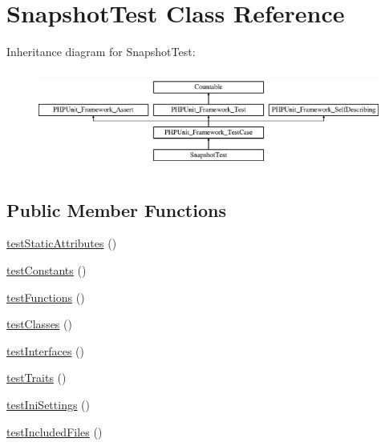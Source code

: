 \hypertarget{class_sebastian_bergmann_1_1_global_state_1_1_snapshot_test}{}\section{Snapshot\+Test Class Reference}
\label{class_sebastian_bergmann_1_1_global_state_1_1_snapshot_test}
Inheritance diagram for Snapshot\+Test\+:\begin{figure}[H]
\begin{center}
\leavevmode
\includegraphics[height=3.303835cm]{class_sebastian_bergmann_1_1_global_state_1_1_snapshot_test}
\end{center}
\end{figure}
\subsection*{Public Member Functions}
\begin{DoxyCompactItemize}
\item 
\mbox{\hyperlink{class_sebastian_bergmann_1_1_global_state_1_1_snapshot_test_a9e6202d04ca505605b8b89d4a6fc947d}{test\+Static\+Attributes}} ()
\item 
\mbox{\hyperlink{class_sebastian_bergmann_1_1_global_state_1_1_snapshot_test_a6569023f4fa1812a53de8a36759faf57}{test\+Constants}} ()
\item 
\mbox{\hyperlink{class_sebastian_bergmann_1_1_global_state_1_1_snapshot_test_a9f093380174fdac4f36043524369e88e}{test\+Functions}} ()
\item 
\mbox{\hyperlink{class_sebastian_bergmann_1_1_global_state_1_1_snapshot_test_ad7e8cfacb1ad6cb474e9730d9e057453}{test\+Classes}} ()
\item 
\mbox{\hyperlink{class_sebastian_bergmann_1_1_global_state_1_1_snapshot_test_aa3fdbc4454d7b0d22d987b4506676408}{test\+Interfaces}} ()
\item 
\mbox{\hyperlink{class_sebastian_bergmann_1_1_global_state_1_1_snapshot_test_a06b21d10beeb609a5158e0960f46fc92}{test\+Traits}} ()
\item 
\mbox{\hyperlink{class_sebastian_bergmann_1_1_global_state_1_1_snapshot_test_a6dcf13e3f0cfeb9bb7e27fd3c3e477fc}{test\+Ini\+Settings}} ()
\item 
\mbox{\hyperlink{class_sebastian_bergmann_1_1_global_state_1_1_snapshot_test_ac1bfb697cab47dbda8b55c1c5c3ba774}{test\+Included\+Files}} ()
\end{DoxyCompactItemize}
